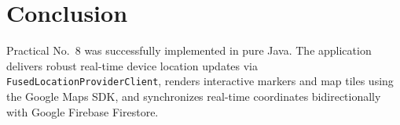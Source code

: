 \documentclass[12pt,a4paper]{article}
\begin{document}
\section*{Conclusion}
Practical No.\ 8 was successfully implemented in pure Java. The application delivers robust real-time device location updates via \texttt{FusedLocationProviderClient}, renders interactive markers and map tiles using the Google Maps SDK, and synchronizes real-time coordinates bidirectionally with Google Firebase Firestore.
\end{document}
